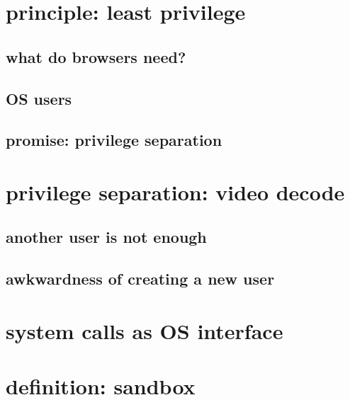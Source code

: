 \graphicspath{{./figures/}}
\usepackage[outputdir=latex.out]{minted}
\title{}
\date{}

\begin{frame}
    \titlepage
\end{frame}



\section{principle: least privilege}


\subsection{what do browsers need?}


\subsection{OS users}


\subsection{promise: privilege separation}


\section{privilege separation: video decode}


\subsection{another user is not enough}


\subsection{awkwardness of creating a new user}


\section{system calls as OS interface}


\section{definition: sandbox}


